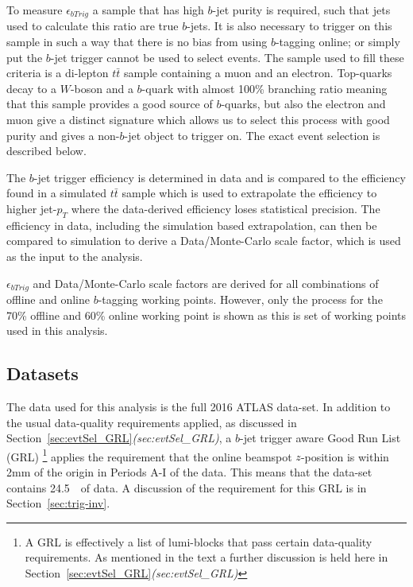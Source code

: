 To measure $\epsilon_{bTrig}$ a sample that has high $b$-jet purity is required,
such that jets used to calculate this ratio are true $b$-jets.
It is also necessary to trigger on this sample in such a way that there is no bias from using $b$-tagging online;
or simply put the $b$-jet trigger cannot be used to select events.
The sample used to fill these criteria is a di-lepton $t\bar{t}$ sample containing a muon and an electron.
Top-quarks decay to a $W$-boson and a $b$-quark with almost 100\% branching ratio meaning that this sample provides a good source of $b$-quarks,
but also the electron and muon give a distinct signature which allows us to select this process with good purity and gives a non-$b$-jet object to trigger on.
The exact event selection is described below. 

The $b$-jet trigger efficiency is determined in data and is compared to the efficiency found in a 
simulated $t\bar{t}$ sample which is used to extrapolate the efficiency to 
higher jet-$p_T$ where the data-derived efficiency loses statistical precision.
The efficiency in data, including the simulation based extrapolation, can then be
compared to simulation to derive a Data/Monte-Carlo scale factor, which is used as the input to the analysis.


$\epsilon_{bTrig}$ and Data/Monte-Carlo scale factors are derived for all combinations of offline and online $b$-tagging working points.
However, only the process for the 70\% offline and 60\% online working point is shown
as this is set of working points used in this analysis.

\subsection{Datasets}
The data used for this analysis is the full 2016 ATLAS data-set.
In addition to the usual data-quality requirements applied,
as discussed in Section~\ref{sec:evtSel_GRL}\textit{(sec:evtSel\_GRL)},
a $b$-jet trigger aware Good Run List (GRL)
\footnote{A GRL is effectively a list of lumi-blocks that pass certain data-quality requirements.
 As mentioned in the text a further discussion is held here in Section~\ref{sec:evtSel_GRL}\textit{(sec:evtSel\_GRL)}}
applies the requirement that the online beamspot $z$-position is within 2mm of the origin in Periods A-I of the data.
This means that the data-set contains 24.5~\ifb~of data.
A discussion of the requirement for this GRL is in Section~\ref{sec:trig-inv}. 

